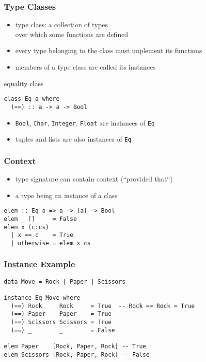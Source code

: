 \documentclass[dvipsnames]{beamer}
\theoremstyle{plain}
\begin{document}
\begin{frame}[fragile]
  \frametitle{Type Classes}

  \begin{itemize}
    \item \alert{type class}: a collection of types\\
      over which some functions are defined
    \item every type belonging to the class must implement its functions
    \item members of a type class are called its \alert{instances}
  \end{itemize}

  \pause
  \begin{exampleblock}{equality class}
    \begin{lstlisting}
class Eq a where
  (==) :: a -> a -> Bool
    \end{lstlisting}
    \begin{itemize}
      \item \lstinline|Bool|, \lstinline|Char|, \lstinline|Integer|, \lstinline|Float|
        are instances of \lstinline|Eq|
      \item tuples and lists are also instances of \lstinline|Eq|
    \end{itemize}
  \end{exampleblock}
\end{frame}

\begin{frame}[fragile]
  \frametitle{Context}

  \begin{itemize}
    \item type signature can contain context (``provided that``)
    \item a type being an instance of a class
  \end{itemize}

  \begin{exampleblock}{}
    \begin{lstlisting}
elem :: Eq a => a -> [a] -> Bool
elem _ []     = False
elem x (c:cs)
  | x == c    = True
  | otherwise = elem x cs
    \end{lstlisting}
  \end{exampleblock}
\end{frame}

\begin{frame}[fragile]
  \frametitle{Instance Example}

  \begin{lstlisting}
data Move = Rock | Paper | Scissors

instance Eq Move where
  (==) Rock     Rock     = True  -- Rock == Rock = True
  (==) Paper    Paper    = True
  (==) Scissors Scissors = True
  (==) _        _        = False

elem Paper    [Rock, Paper, Rock] -- True
elem Scissors [Rock, Paper, Rock] -- False
  \end{lstlisting}
\end{frame}
\end{document}
